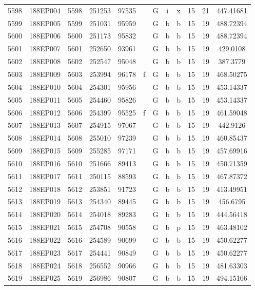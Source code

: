 \begin{tabular}{|*{12}{c|}}
5598 & 188EP004 & 5598 & 251253 & 97535 &  & G & i & x & 15 & 21 & 447.41681 \\ 
5599 & 188EP005 & 5599 & 251031 & 95959 &  & G & b & b & 15 & 19 & 488.72394 \\ 
5600 & 188EP006 & 5600 & 251173 & 95832 &  & G & b & b & 15 & 19 & 488.72394 \\ 
5601 & 188EP007 & 5601 & 252650 & 93961 &  & G & b & b & 15 & 19 & 429.0108 \\ 
5602 & 188EP008 & 5602 & 252547 & 95048 &  & G & b & b & 15 & 19 & 387.3779 \\ 
5603 & 188EP009 & 5603 & 253994 & 96178 & f & G & b & b & 15 & 19 & 468.50275 \\ 
5604 & 188EP010 & 5604 & 254301 & 95956 &  & G & b & b & 15 & 19 & 453.14337 \\ 
5605 & 188EP011 & 5605 & 254460 & 95826 &  & G & b & b & 15 & 19 & 453.14337 \\ 
5606 & 188EP012 & 5606 & 254399 & 95525 & f & G & b & b & 15 & 19 & 461.59048 \\ 
5607 & 188EP013 & 5607 & 254915 & 97067 &  & G & b & b & 15 & 19 & 442.9126 \\ 
5608 & 188EP014 & 5608 & 255010 & 97239 &  & G & b & b & 15 & 19 & 460.85437 \\ 
5609 & 188EP015 & 5609 & 255285 & 97171 &  & G & b & b & 15 & 19 & 457.69916 \\ 
5610 & 188EP016 & 5610 & 251666 & 89413 &  & G & b & b & 15 & 19 & 450.71359 \\ 
5611 & 188EP017 & 5611 & 250115 & 88593 &  & G & b & b & 15 & 19 & 467.87372 \\ 
5612 & 188EP018 & 5612 & 253851 & 91723 &  & G & b & b & 15 & 19 & 413.49951 \\ 
5613 & 188EP019 & 5613 & 254340 & 89445 &  & G & b & b & 15 & 19 & 456.6795 \\ 
5614 & 188EP020 & 5614 & 254018 & 89283 &  & G & b & b & 15 & 19 & 444.56418 \\ 
5615 & 188EP021 & 5615 & 254708 & 90558 &  & G & b & p & 15 & 19 & 463.48102 \\ 
5616 & 188EP022 & 5616 & 254589 & 90699 &  & G & b & b & 15 & 19 & 450.62277 \\ 
5617 & 188EP023 & 5617 & 254441 & 90849 &  & G & b & b & 15 & 19 & 450.62277 \\ 
5618 & 188EP024 & 5618 & 256552 & 90966 &  & G & b & b & 15 & 19 & 481.63303 \\ 
5619 & 188EP025 & 5619 & 256986 & 90807 &  & G & b & b & 15 & 19 & 494.15106 \\ 

\end{tabular}
